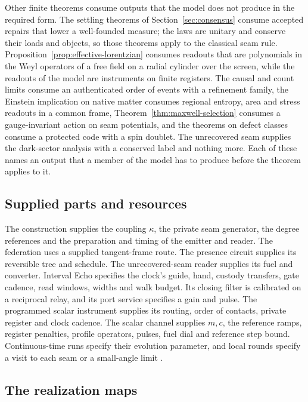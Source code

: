 \documentclass[11pt]{article}
\theoremstyle{definition}
\theoremstyle{remark}
\begin{document}
Other finite theorems consume outputs that the model does not produce in
the required form. The settling theorems of Section~\ref{sec:consensus}
consume accepted repairs that lower a well-founded measure; the laws are
unitary and conserve their loads and objects, so those theorems apply to
the classical seam rule. Proposition~\ref{prop:effective-lorentzian}
consumes readouts that are polynomials in the Weyl operators of a free field
on a radial cylinder over the screen, while the readouts of the model are
instruments on finite registers. The causal and count limits consume an
authenticated order of events with a refinement family, the Einstein
implication on native matter consumes regional entropy, area and stress
readouts in a common frame, Theorem~\ref{thm:maxwell-selection} consumes a gauge-invariant action
on seam potentials, and the theorems on defect classes consume a protected
code with a spin doublet. The unrecovered seam supplies the dark-sector analysis with a
conserved label and nothing more. Each of these names an output that a
member of the model has to produce before the theorem applies to it.

\subsection{Supplied parts and resources}
\label{sec:supplied}

The construction supplies the coupling $\kappa$, the private seam
generator, the degree references and the preparation and timing of the
emitter and reader. The federation uses a supplied tangent-frame route.
The presence circuit supplies its reversible tree and schedule. The
unrecovered-seam reader supplies its fuel and converter. Interval Echo
specifies the clock's guide, hand, custody transfers, gate cadence, read
windows, widths and walk budget. Its closing filter is calibrated on a
reciprocal relay, and its port service specifies a gain and pulse. The
programmed scalar instrument supplies its routing, order of contacts,
private register and clock cadence. The scalar channel supplies $m,c$,
the reference ramps, register penalties, profile operators, pulses, fuel
dial and reference step bound. Continuous-time runs specify their
evolution parameter, and local rounds specify a visit to each seam or a
small-angle limit \cite{ophspine,ophmodel}.

\subsection{The realization maps}
\label{sec:standing-maps}
\end{document}
